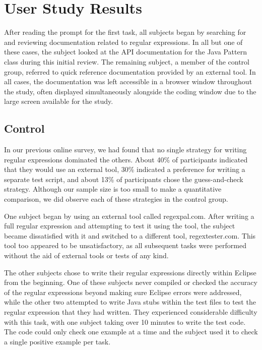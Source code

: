 \documentclass[10pt, conference, compsocconf]{IEEEtran}
\begin{document}

\section{User Study Results}
After reading the prompt for the first task, all subjects began by searching for and reviewing documentation related to regular expressions. In all but one of these cases, the subject looked at the API documentation for the Java Pattern class during this initial review. The remaining subject, a member of the control group, referred to quick reference documentation provided by an external tool. In all cases, the documentation was left accessible in a browser window throughout the study, often displayed simultaneously alongside the coding window due to the large screen available for the study.

\subsection{Control}
In our previous online survey, we had found that no single strategy for writing regular expressions dominated the others. About 40\% of participants indicated that they would use an external tool, 30\% indicated a preference for writing a separate test script, and about 13\% of participants chose the guess-and-check strategy. Although our sample size is too small to make a quantitative comparison, we did observe each of these strategies in the control group. 

One subject began by using an external tool called regexpal.com. After writing a full regular expression and attempting to test it using the tool, the subject became dissatisfied with it and switched to a different tool, regextester.com. This tool too appeared to be unsatisfactory, as all subsequent tasks were performed without the aid of external tools or tests of any kind.

The other subjects chose to write their regular expressions directly within Eclipse from the beginning. One of these subjects never compiled or checked the accuracy of the regular expressions beyond making sure Eclipse errors were addressed, while the other two attempted to write Java stubs within the test files to test the regular expression that they had written. They experienced considerable difficulty with this task, with one subject taking over 10 minutes to write the test code. The code could only check one example at a time and the subject used it to check a single positive example per task.
\end{document}
